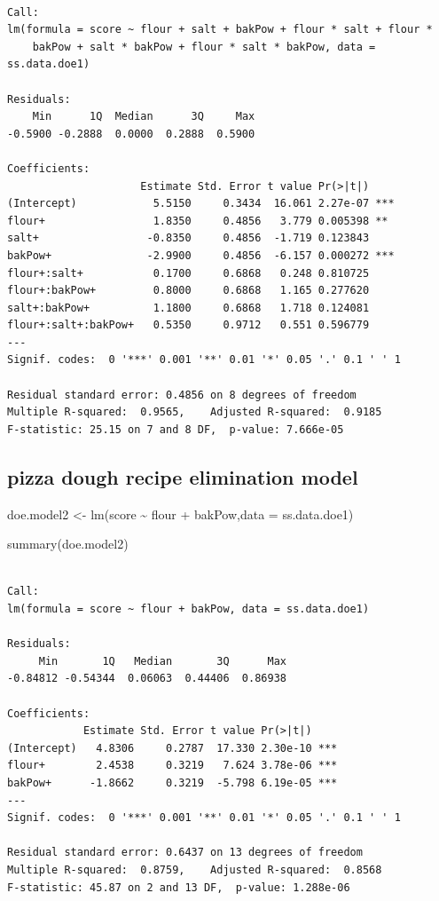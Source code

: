 \documentclass[
  a4paper,
]{scrbook}
\newenvironment{Shaded}{\begin{snugshade}}{\end{snugshade}}
\newcommand{\AttributeTok}[1]{\textcolor[rgb]{0.40,0.45,0.13}{#1}}
\newcommand{\FunctionTok}[1]{\textcolor[rgb]{0.28,0.35,0.67}{#1}}
\newcommand{\NormalTok}[1]{\textcolor[rgb]{0.00,0.23,0.31}{#1}}
\newcommand{\OtherTok}[1]{\textcolor[rgb]{0.00,0.23,0.31}{#1}}
\newcommand{\SpecialCharTok}[1]{\textcolor[rgb]{0.37,0.37,0.37}{#1}}
\begin{document}
\begin{verbatim}

Call:
lm(formula = score ~ flour + salt + bakPow + flour * salt + flour * 
    bakPow + salt * bakPow + flour * salt * bakPow, data = ss.data.doe1)

Residuals:
    Min      1Q  Median      3Q     Max 
-0.5900 -0.2888  0.0000  0.2888  0.5900 

Coefficients:
                     Estimate Std. Error t value Pr(>|t|)    
(Intercept)            5.5150     0.3434  16.061 2.27e-07 ***
flour+                 1.8350     0.4856   3.779 0.005398 ** 
salt+                 -0.8350     0.4856  -1.719 0.123843    
bakPow+               -2.9900     0.4856  -6.157 0.000272 ***
flour+:salt+           0.1700     0.6868   0.248 0.810725    
flour+:bakPow+         0.8000     0.6868   1.165 0.277620    
salt+:bakPow+          1.1800     0.6868   1.718 0.124081    
flour+:salt+:bakPow+   0.5350     0.9712   0.551 0.596779    
---
Signif. codes:  0 '***' 0.001 '**' 0.01 '*' 0.05 '.' 0.1 ' ' 1

Residual standard error: 0.4856 on 8 degrees of freedom
Multiple R-squared:  0.9565,    Adjusted R-squared:  0.9185 
F-statistic: 25.15 on 7 and 8 DF,  p-value: 7.666e-05
\end{verbatim}

\subsection{pizza dough recipe elimination
model}\label{pizza-dough-recipe-elimination-model}

\begin{Shaded}
\begin{Highlighting}[]
\NormalTok{doe.model2 }\OtherTok{\textless{}{-}} \FunctionTok{lm}\NormalTok{(score }\SpecialCharTok{\textasciitilde{}}\NormalTok{ flour }\SpecialCharTok{+}\NormalTok{ bakPow,}\AttributeTok{data =}\NormalTok{ ss.data.doe1)}

\FunctionTok{summary}\NormalTok{(doe.model2)}
\end{Highlighting}
\end{Shaded}

\begin{verbatim}

Call:
lm(formula = score ~ flour + bakPow, data = ss.data.doe1)

Residuals:
     Min       1Q   Median       3Q      Max 
-0.84812 -0.54344  0.06063  0.44406  0.86938 

Coefficients:
            Estimate Std. Error t value Pr(>|t|)    
(Intercept)   4.8306     0.2787  17.330 2.30e-10 ***
flour+        2.4538     0.3219   7.624 3.78e-06 ***
bakPow+      -1.8662     0.3219  -5.798 6.19e-05 ***
---
Signif. codes:  0 '***' 0.001 '**' 0.01 '*' 0.05 '.' 0.1 ' ' 1

Residual standard error: 0.6437 on 13 degrees of freedom
Multiple R-squared:  0.8759,    Adjusted R-squared:  0.8568 
F-statistic: 45.87 on 2 and 13 DF,  p-value: 1.288e-06
\end{verbatim}
\end{document}
